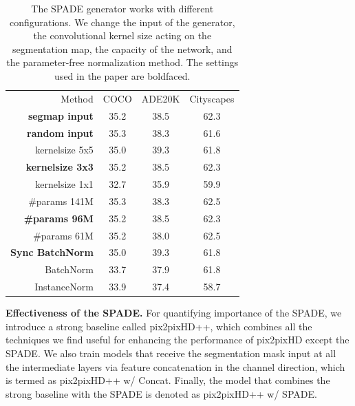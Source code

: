 \begin{table}[!tbh]
	\centering
	\small
    \begin{tabular}{r||c|c|c}
Method  & COCO & ADE20K & Cityscapes  \\
\Xhline{2\arrayrulewidth}
\textbf{segmap input} & 35.2 & 38.5 & 62.3 \\
\textbf{random input} & 35.3 & 38.3 & 61.6 \\
\hline
kernelsize 5x5 & 35.0 & 39.3 & 61.8 \\
\textbf{kernelsize 3x3} & 35.2 & 38.5 & 62.3\\
kernelsize 1x1 & 32.7 & 35.9 & 59.9\\
\hline
\#params 141M  & 35.3 & 38.3 & 62.5\\
\textbf{\#params 96M} & 35.2 & 38.5 & 62.3\\
\#params 61M & 35.2 & 38.0 & 62.5\\
\hline
\textbf{Sync BatchNorm} & 35.0 & 39.3 & 61.8\\
BatchNorm & 33.7 & 37.9 & 61.8\\
InstanceNorm & 33.9 & 37.4 & 58.7\\

\end{tabular}
\caption{The SPADE generator works with different configurations. We change the input of the generator, the convolutional kernel size acting on the segmentation map, the capacity of the network, and the parameter-free normalization method. The settings used in the paper are boldfaced.}\label{tbl::variation}		

 \end{table}

\begin{figure}[]
  \centering

 \label{fig::multimodal}

\end{figure}

{\bf Effectiveness of the SPADE.} For quantifying importance of the SPADE, we introduce a strong baseline called pix2pixHD++, which combines all the techniques we find useful for enhancing the performance of pix2pixHD except the SPADE. We also train models that receive the segmentation mask input at all the intermediate layers via feature concatenation in the channel direction, which is termed as pix2pixHD++ w/ Concat. Finally, the model that combines the strong baseline with the SPADE is denoted as pix2pixHD++ w/ SPADE. 

